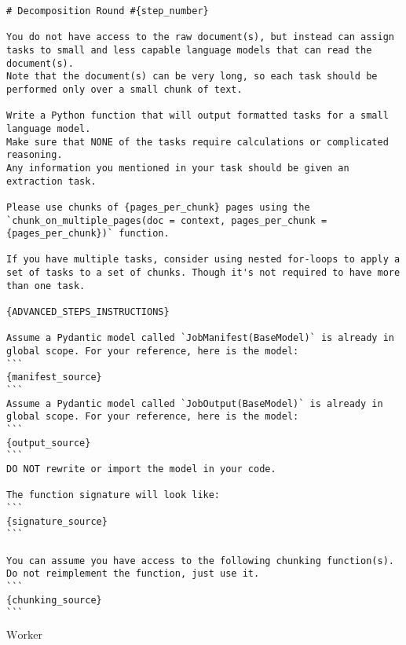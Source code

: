 \begin{tcolorbox}[colback=gray!10,  width=\textwidth]
\begin{lstlisting}[breaklines]
# Decomposition Round #{step_number}

You do not have access to the raw document(s), but instead can assign tasks to small and less capable language models that can read the document(s).
Note that the document(s) can be very long, so each task should be performed only over a small chunk of text.

Write a Python function that will output formatted tasks for a small language model.
Make sure that NONE of the tasks require calculations or complicated reasoning.
Any information you mentioned in your task should be given an extraction task.

Please use chunks of {pages_per_chunk} pages using the `chunk_on_multiple_pages(doc = context, pages_per_chunk ={pages_per_chunk})` function.

If you have multiple tasks, consider using nested for-loops to apply a set of tasks to a set of chunks. Though it's not required to have more than one task.

{ADVANCED_STEPS_INSTRUCTIONS}

Assume a Pydantic model called `JobManifest(BaseModel)` is already in global scope. For your reference, here is the model:
```
{manifest_source}
```
Assume a Pydantic model called `JobOutput(BaseModel)` is already in global scope. For your reference, here is the model:
```
{output_source}
```
DO NOT rewrite or import the model in your code.

The function signature will look like:
```
{signature_source}
```

You can assume you have access to the following chunking function(s). Do not reimplement the function, just use it.
```
{chunking_source}
```
\end{lstlisting}
\end{tcolorbox}

\textbf{$\mathrm{Worker}$}


